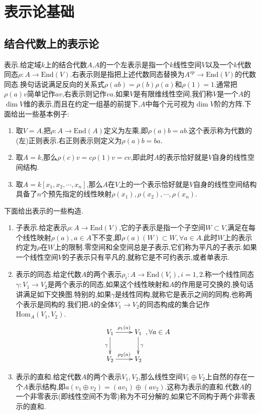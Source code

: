 \chapter{表示论基础}
\section{结合代数上的表示论}

表示.给定域$k$上的结合代数$A$,$A$的一个左表示是指一个$k$线性空间$V$以及一个$k$代数同态$\rho:A\to\mathrm{End}(V)$.右表示则是指把上述代数同态替换为$A^{op}\to\mathrm{End}(V)$的代数同态.换句话说满足反向的关系式$\rho(ab)=\rho(b)\rho(a)$和$\rho(1)=1$.通常把$\rho(a)v$简单记作$av$,右表示则记作$va$.如果$V$是有限维线性空间,我们称$V$是一个$A$的$\dim V$维的表示,而且在约定一组基的前提下,$A$中每个元可视为$\dim V$阶的方阵.下面给出一些基本例子:
\begin{enumerate}
	\item 取$V=A$,把$\rho:A\to\mathrm{End}(A)$定义为左乘,即$\rho(a)b=ab$.这个表示称为代数的(左)正则表示.右正则表示则定义为$\rho(a)b=ba$.
	\item 取$A=k$,那么$\rho(c)v=c\rho(1)v=cv$,即此时$A$的表示恰好就是$V$自身的线性空间结构.
	\item 取$A=k[x_1,x_2,\cdots,x_n]$,那么$A$在$V$上的一个表示恰好就是$V$自身的线性空间结构具备了$n$个预先指定的线性映射$\rho(x_1),\rho(x_2),\cdots,\rho(x_n)$.
\end{enumerate}

下面给出表示的一些构造.
\begin{enumerate}
	\item 子表示.给定表示$\rho:A\to\mathrm{End}(V)$,它的子表示是指一个子空间$W\subset V$,满足在每个线性映射$\rho(a),a\in A$下不变,即$\rho(a)(W)\subset W,\forall a\in A$.此时$W$上的表示约定为$\rho$在$W$上的限制.零空间和全空间总是子表示,它们称为平凡的子表示.如果一个线性空间$V$的子表示只有平凡的,就称它是不可约表示,或者单表示.
	\item 表示的同态.给定代数$A$的两个表示$\rho_i:A\to\mathrm{End}(V_i),i=1,2$.称一个线性同态$\gamma:V_1\to V_2$是两个表示的同态,如果这个线性映射和$A$的作用是可交换的,换句话讲满足如下交换图.特别的,如果$\gamma$是线性同构,就称它是表示之间的同构,也称两个表示是同构的.我们把$A$的全体$V_1\to V_2$的同态构成的集合记作$\mathrm{Hom}_A(V_1,V_2)$.
	$$\xymatrix{
		V_1\ar[r]^{\rho_1(a)}\ar[d]_{\gamma}&V_1\ar[d]^{\gamma}\\
		V_2\ar[r]^{\rho_2(a)}&V_2},\forall a\in A$$
	\item 表示的直和.给定代数$A$的两个表示$V_1,V_2$,那么线性空间$V_1\oplus V_2$上自然的存在一个$A$表示结构,即$a(v_1\oplus v_2)=(av_1)\oplus(av_2)$.这称为表示的直和.代数$A$的一个非零表示(即线性空间不为零)称为不可分解的,如果它不同构于两个非零表示的直和.
\end{enumerate}

